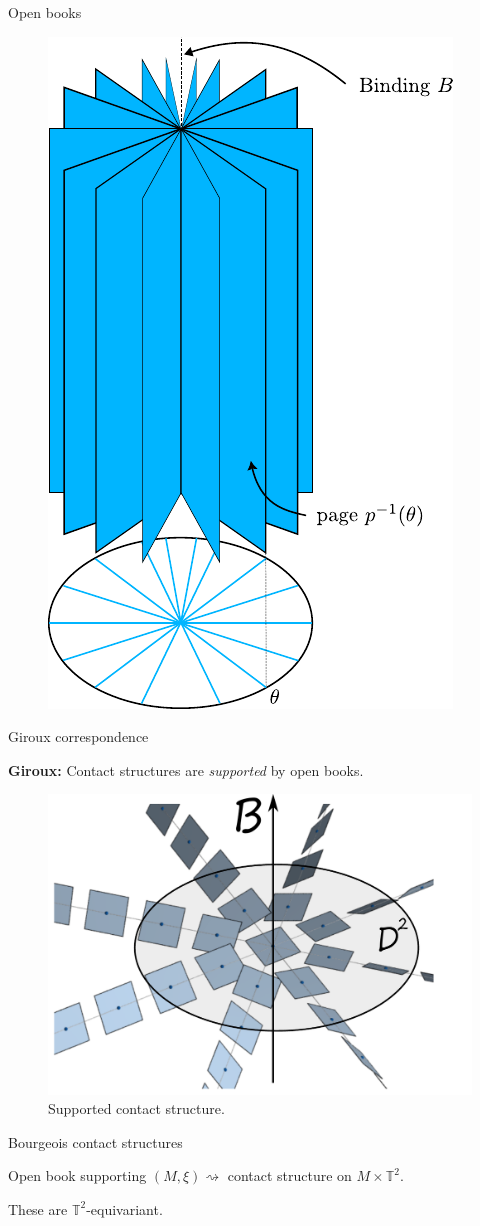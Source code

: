 \documentclass{beamer}
\begin{document}
\begin{frame}{Open books}
    \begin{figure}
        \centering
        \includegraphics[width=.4\linewidth]{../images/open_book.pdf}
    \end{figure}
\end{frame}

\begin{frame}{Giroux correspondence}

\begin{tcolorbox}
\textbf{Giroux:} Contact structures are \emph{supported} by open books.
\end{tcolorbox} 

\begin{figure}
    \centering
    \includegraphics[width=0.6\linewidth]{standardctct.pdf}
    \caption{Supported contact structure.}
    \label{fig:adapted}
\end{figure}

\end{frame}

\begin{frame}{Bourgeois contact structures}
    \begin{theorem}[Bourgeois '02]
    Open book supporting $(M,\xi)\rightsquigarrow$ contact structure on $M\times \mathbb T^2$.
    \end{theorem}

 These are $\mathbb T^2$-equivariant.   
    
\end{frame}
\end{document}
